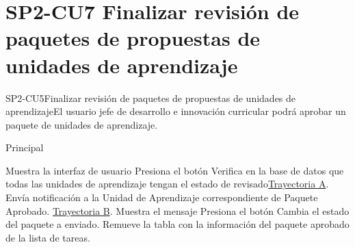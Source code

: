 ﻿\chapter{SP2-CU7 Finalizar revisión de paquetes de propuestas de unidades de aprendizaje}

\begin{UseCase}{SP2-CU5}{Finalizar revisión de paquetes de propuestas de unidades de aprendizaje}{El usuario jefe de desarrollo e innovación curricular podrá aprobar un paquete de unidades de aprendizaje.}
\end{UseCase}

\begin{UCtrayectoria}{Principal}


    \UCpaso Muestra la interfaz de usuario 
    \UCpaso[\UCactor] Presiona el botón 
    \UCpaso Verifica en la base de datos que todas las unidades de aprendizaje tengan el estado de revisado\hyperref[SP2-CU5-A]{Trayectoria A}.
    \UCpaso Envía notificación a la Unidad de Aprendizaje correspondiente de Paquete Aprobado. \hyperref[SP2-CU5-B]{Trayectoria B}.
    \UCpaso Muestra el mensaje 
    \UCpaso[\UCactor] Presiona el botón 
    \UCpaso Cambia el estado del paquete a enviado.
    \UCpaso Remueve la tabla con la información del paquete aprobado de la lista de tareas.

\end{UCtrayectoria}


